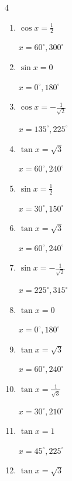 \begin{multicols}{4}
\begin{enumerate}
  \item $\displaystyle \cos{x}  = \frac{1}{2}$

        $\displaystyle x = 60^{\circ} , 300^{\circ}$

  \item $\displaystyle \sin{x}  = 0$

        $\displaystyle x = 0^{\circ} , 180^{\circ}$

  \item $\displaystyle \cos{x}  = -\frac{1}{\sqrt{2}}$

        $\displaystyle x = 135^{\circ} , 225^{\circ}$

  \item $\displaystyle \tan{x}  = \sqrt{3}$

        $\displaystyle x = 60^{\circ} , 240^{\circ}$

\columnbreak %

\resetques

  \item $\displaystyle \sin{x}  = \frac{1}{2}$

        $\displaystyle x = 30^{\circ} , 150^{\circ}$

  \item $\displaystyle \tan{x}  = \sqrt{3}$

        $\displaystyle x = 60^{\circ} , 240^{\circ}$

  \item $\displaystyle \sin{x}  = -\frac{1}{\sqrt{2}}$

        $\displaystyle x = 225^{\circ} , 315^{\circ}$

  \item $\displaystyle \tan{x}  = 0$

        $\displaystyle x = 0^{\circ} , 180^{\circ}$

  \item $\displaystyle \tan{x}  = \sqrt{3}$

        $\displaystyle x = 60^{\circ} , 240^{\circ}$

  \item $\displaystyle \tan{x}  = \frac{1}{\sqrt{3}}$

        $\displaystyle x = 30^{\circ} , 210^{\circ}$

  \item $\displaystyle \tan{x}  = 1$

        $\displaystyle x = 45^{\circ} , 225^{\circ}$

  \item $\displaystyle \tan{x}  = \sqrt{3}$


\end{enumerate}
\end{multicols}
